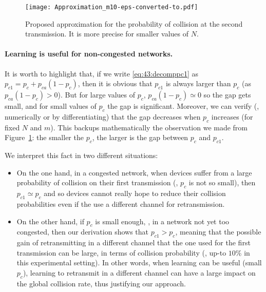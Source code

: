 \begin{figure}[htp!]  %
	\centering
	\texttt{[image: Approximation\_m10-eps-converted-to.pdf]}
	\caption[Proposed approximation for the probability of collision at the second transmission]{Proposed approximation for the probability of collision at the second transmission. It is more precise for smaller values of $N$.}
	\label{fig:43:Approximation_m10}
\end{figure}


\paragraph{Learning is useful for non-congested networks.}

It is worth to highlight that, if we write \eqref{eq:43:decomppc1} as $p_{c1} = p_c + p_{ca} \left(1-p_c\right)$,
then it is obvious that $p_{c1}$ is always larger than $p_c$ (as $p_{ca} \left(1-p_c\right) > 0$).
But for large values of $p_c$, $p_{ca}\left(1-p_c\right) \simeq 0$ so the gap gets small,
and for small values of $p_c$ the gap is significant.
Moreover, we can verify (\eg, numerically or by differentiating)
that the gap decreases when $p_c$ increases (for fixed $N$ and $m$).
This backups mathematically the observation we made from Figure~\ref{fig:43:Approximation_m10}:
the smaller the $p_c$, the larger is the gap between $p_c$ and $p_{c1}$.

We interpret this fact in two different situations:
\begin{itemize}
	\item
	On the one hand, in a congested network, when devices suffer from a large probability of collision on their first transmission (\ie, $p_c$ is not so small), then $p_{c1}\simeq p_c$ and so devices cannot really hope to reduce their collision probabilities even if the use a different channel for retransmission.
	\item
	On the other hand, if $p_c$ is small enough, \ie, in a network not yet too congested, then our derivation shows that $p_{c1} > p_c$, meaning that the possible gain of retransmitting in a different channel that the one used for the first transmission can be large, in terms of collision probability (\eg, up-to $10\%$ in this experimental setting).
	In other words, when learning can be useful (small $p_c$), learning to retransmit in a different channel can have a large impact on the global collision rate,
	thus justifying our approach.
\end{itemize}

